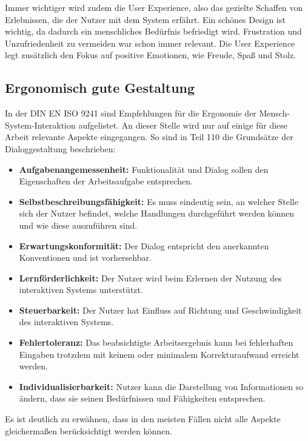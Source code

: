 Immer wichtiger wird zudem die User Experience, also das gezielte Schaffen von Erlebnissen, die der Nutzer mit dem System erfährt. Ein schönes Design ist wichtig, da dadurch ein menschliches Bedürfnis befriedigt wird. Frustration und Unzufriedenheit zu vermeiden war schon immer relevant. Die User Experience legt zusätzlich den Fokus auf positive Emotionen, wie Freude, Spaß und Stolz. \cite{Hassenzahl2006}

\subsection{Ergonomisch gute Gestaltung}
In der DIN EN ISO 9241 sind Empfehlungen für die Ergonomie der Mensch-System-Interaktion aufgelistet. An dieser Stelle wird nur auf einige für diese Arbeit relevante Aspekte eingegangen. So sind in Teil 110 \cite{ISO9241-110} die Grundsätze der Dialoggestaltung beschrieben:
\begin{itemize}
\item \textbf{Aufgabenangemessenheit:} Funktionalität und Dialog sollen den Eigenschaften der Arbeitsaufgabe entsprechen.
\item \textbf{Selbstbeschreibungsfähigkeit:}  Es muss eindeutig sein, an welcher Stelle sich der Nutzer befindet, welche Handlungen durchgeführt werden können und wie diese auszuführen sind.
\item \textbf{Erwartungskonformität:} Der Dialog entspricht den anerkannten Konventionen und ist vorhersehbar.
\item \textbf{Lernförderlichkeit:} Der Nutzer wird beim Erlernen der Nutzung des interaktiven Systems unterstützt.
\item \textbf{Steuerbarkeit:} Der Nutzer hat Einfluss auf Richtung und Geschwindigkeit des interaktiven Systems.
\item \textbf{Fehlertoleranz:} Das beabsichtigte Arbeitsergebnis kann bei fehlerhaften Eingaben trotzdem mit keinem oder minimalem Korrekturaufwand erreicht werden.
\item \textbf{Individualisierbarkeit:} Nutzer kann die Darstellung von Informationen so ändern, dass sie seinen Bedürfnissen und Fähigkeiten entsprechen.
\end{itemize}
Es ist deutlich zu erwähnen, dass in den meisten Fällen nicht alle Aspekte gleichermaßen berücksichtigt werden können.

